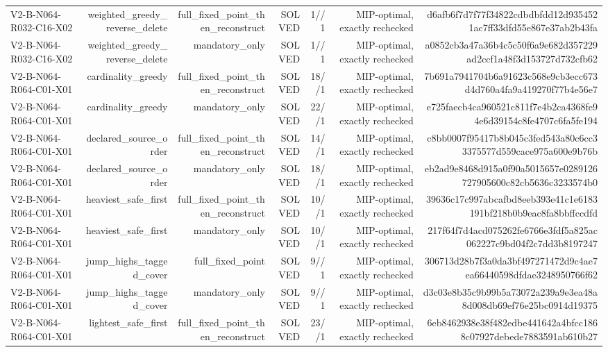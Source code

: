 {\begin{longtable}{lrrrrrr}
V2-B-N064-R032-C16-X02 & weighted\_greedy\_reverse\_delete & full\_fixed\_point\_then\_reconstruct & SOLVED & 1//1 & MIP-optimal, exactly rechecked & d6afb6f7d7f77f34822cdbdbfdd12d9354521ac7ff33dfd55e867e37ab2b43fa \\
V2-B-N064-R032-C16-X02 & weighted\_greedy\_reverse\_delete & mandatory\_only & SOLVED & 1//1 & MIP-optimal, exactly rechecked & a0852cb3a47a36b4c5c50f6a9e682d357229ad2ccf1a48f3d153727d732cfb62 \\
V2-B-N064-R064-C01-X01 & cardinality\_greedy & full\_fixed\_point\_then\_reconstruct & SOLVED & 18//1 & MIP-optimal, exactly rechecked & 7b691a7941704b6a91623c568e9cb3ecc673d4d760a4fa9a419270f77b4e56e7 \\
V2-B-N064-R064-C01-X01 & cardinality\_greedy & mandatory\_only & SOLVED & 22//1 & MIP-optimal, exactly rechecked & e725faecb4ca960521c811f7e4b2ca4368fe94e6d39154c8fe4707c6fa5fe194 \\
V2-B-N064-R064-C01-X01 & declared\_source\_order & full\_fixed\_point\_then\_reconstruct & SOLVED & 14//1 & MIP-optimal, exactly rechecked & c8bb0007f95417b8b045c3fed543a80c6cc33375577d559cace975a600e9b76b \\
V2-B-N064-R064-C01-X01 & declared\_source\_order & mandatory\_only & SOLVED & 18//1 & MIP-optimal, exactly rechecked & eb2ad9e8468d915a0f90a5015657e0289126727905600c82cb5636c3233574b0 \\
V2-B-N064-R064-C01-X01 & heaviest\_safe\_first & full\_fixed\_point\_then\_reconstruct & SOLVED & 10//1 & MIP-optimal, exactly rechecked & 39636c17c997abcafbd8eeb393e41c1e6183191bf218b0b9eac8fa8bbffccdfd \\
V2-B-N064-R064-C01-X01 & heaviest\_safe\_first & mandatory\_only & SOLVED & 10//1 & MIP-optimal, exactly rechecked & 217f64f7d4acd075262fe6766e3fdf5a825ac062227c9bd04f2c7dd3b8197247 \\
V2-B-N064-R064-C01-X01 & jump\_highs\_tagged\_cover & full\_fixed\_point & SOLVED & 9//1 & MIP-optimal, exactly rechecked & 306713d28b7f3a0da3bf497271472d9c4ae7ea66440598dfdae3248950766f62 \\
V2-B-N064-R064-C01-X01 & jump\_highs\_tagged\_cover & mandatory\_only & SOLVED & 9//1 & MIP-optimal, exactly rechecked & d3c03e8b35c9b99b5a73072a239a9e3ea48a8d008db69ef76e25bc0914d19375 \\
V2-B-N064-R064-C01-X01 & lightest\_safe\_first & full\_fixed\_point\_then\_reconstruct & SOLVED & 23//1 & MIP-optimal, exactly rechecked & 6eb8462938e38f482edbe441642a4bfcc1868c07927debede7883591ab610b27 \\

\end{longtable}}
